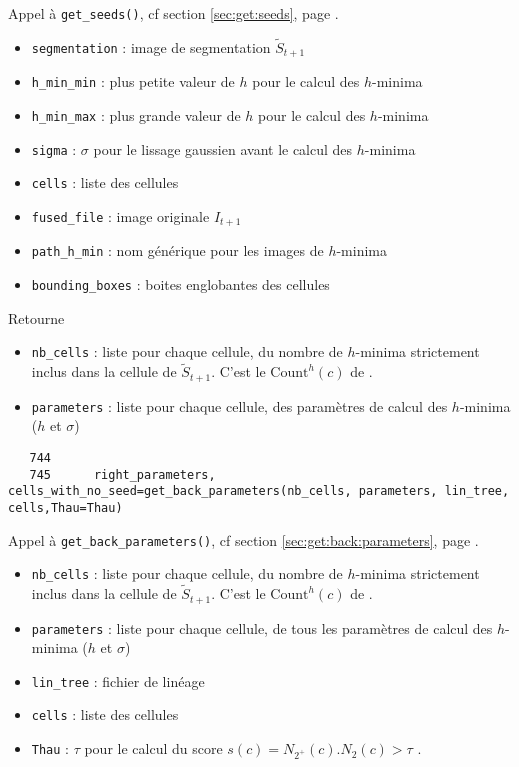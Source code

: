 \documentclass{article}
\def \mycolor {red}
\begin{document}
\color{\mycolor}
Appel \`a \texttt{get\_seeds()}, cf section \ref{sec:get:seeds}, page \pageref{sec:get:seeds}.
\begin{itemize}
\itemsep -1ex
\item \verb|segmentation| : image de segmentation $\tilde{S}_{t+1}$ 
\item \verb|h_min_min| : plus petite valeur de $h$ pour le calcul des $h$-minima
\item \verb|h_min_max| : plus grande valeur de $h$ pour le calcul des $h$-minima
\item \verb|sigma| : $\sigma$ pour le lissage gaussien avant le calcul des $h$-minima
\item \verb|cells| : liste des cellules
\item \verb|fused_file| : image originale $I_{t+1}$
\item \verb|path_h_min| : nom g\'en\'erique pour les images de $h$-minima
\item \verb|bounding_boxes| : boites englobantes des cellules
\end{itemize}
Retourne
\begin{itemize}
\itemsep -1ex
\item \verb|nb_cells| : liste pour chaque cellule, du nombre de $h$-minima strictement inclus dans la cellule de  $\tilde{S}_{t+1}$. C'est le $\mathrm{Count}^{h}(c)$ de \cite[section 2.3.3.5, page 71]{guignard:tel-01278725}.
\item \verb|parameters| : liste pour chaque cellule,  des param\`etres de calcul des $h$-minima ($h$ et $\sigma$)
\end{itemize}
\color{black}
\begin{verbatim}  
   744	  
   745	    right_parameters, cells_with_no_seed=get_back_parameters(nb_cells, parameters, lin_tree, cells,Thau=Thau)
\end{verbatim} 
\color{\mycolor}
Appel \`a \texttt{get\_back\_parameters()}, cf section \ref{sec:get:back:parameters}, page \pageref{sec:get:back:parameters}.
\begin{itemize}
\itemsep -1ex
\item \verb|nb_cells| : liste pour chaque cellule, du nombre de $h$-minima strictement inclus dans la cellule de  $\tilde{S}_{t+1}$. C'est le $\mathrm{Count}^{h}(c)$ de \cite[section 2.3.3.5, page 71]{guignard:tel-01278725}.
\item \verb|parameters| : liste pour chaque cellule,  de tous les param\`etres de calcul des $h$-minima ($h$ et $\sigma$)
\item \verb|lin_tree| : fichier de lin\'eage
\item \verb|cells| : liste des cellules
\item \verb|Thau| : $\tau$ pour le calcul du score $s(c) = N_{2^{+}}(c) . N_2(c) > \tau$ \cite[page 72]{guignard:tel-01278725}.
\end{itemize}
\end{document}
